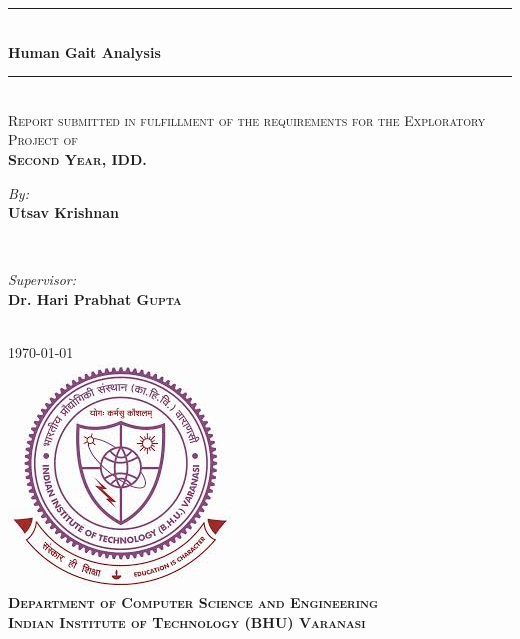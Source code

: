 \begin{titlepage}

\newcommand{\HRule}{\rule{\linewidth}{0.5mm}} 

\center 

\HRule \\[0.4cm]
{ \huge \bfseries Human Gait Analysis}\\[0.4cm] 
\HRule \\[1.5cm]

\textsc{\large Report submitted in fulfillment of the requirements
for the Exploratory Project of\\ 
\bfseries{Second Year, IDD}.}\\[0.5cm]

\begin{minipage}{0.4\textwidth}
\begin{flushleft} \large
\emph{By:}\\
\bfseries Utsav Krishnan \\
\end{flushleft}
\end{minipage}
~
\begin{minipage}{0.4\textwidth}
\begin{flushright} \large
\emph{Supervisor:} \\
\bfseries Dr. Hari Prabhat \textsc{Gupta} 
\end{flushright}
\end{minipage}\\[1cm]


{\large \today}\\[1cm] 

\includegraphics{pictures/logo.jpeg}\\[1.0cm]

\textsc{\Large \bfseries Department of Computer Science and Engineering}\\[0.5cm] 

\textsc{\Large \bfseries Indian Institute of Technology (BHU) Varanasi}\\[0.5cm] 

\vfill 
\end{titlepage}
